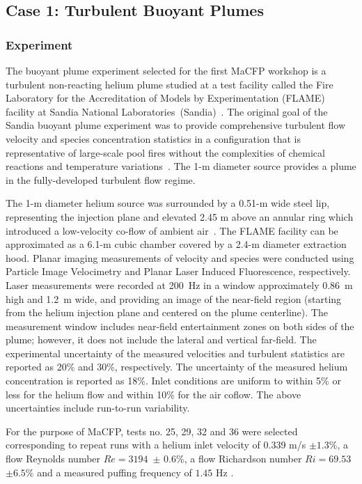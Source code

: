 
\subsection{Case 1: Turbulent Buoyant Plumes} \label{sec:buoyant_plumes}

\subsubsection{Experiment}

The buoyant plume experiment selected for the first MaCFP workshop is a turbulent non-reacting helium plume studied at a test facility called the Fire Laboratory for the Accreditation of Models by Experimentation (FLAME) facility at Sandia National Laboratories~(Sandia)~\cite{Blanchat:2001,Case1_EXP}. The original goal of the Sandia buoyant plume experiment was to provide comprehensive turbulent flow velocity and species concentration statistics in a configuration that is representative of large-scale pool fires without the complexities of chemical reactions and temperature variations~\cite{Case1_EXP}.  The 1-m diameter source provides a plume in the fully-developed turbulent flow regime.  

The 1-m diameter helium source was surrounded by a 0.51-m wide steel lip, representing the injection plane and elevated 2.45 m above an annular ring which introduced a low-velocity co-flow of ambient air~\cite{Blanchat:2001}. The FLAME facility can be approximated as a 6.1-m cubic chamber covered by a 2.4-m diameter extraction hood. Planar imaging measurements of velocity and species were conducted using Particle Image Velocimetry and Planar Laser Induced Fluorescence, respectively. Laser measurements were recorded at 200~Hz in a window approximately 0.86~m high and 1.2~m wide, and providing an image of the near-field region (starting from the helium injection plane and centered on the plume centerline). The measurement window includes near-field entertainment zones on both sides of the plume; however, it does not include the lateral and vertical far-field. The experimental uncertainty of the measured velocities and turbulent statistics are reported as 20\% and 30\%, respectively. The uncertainty of the measured helium concentration is reported as 18\%. Inlet conditions are uniform to within 5\% or less for the helium flow and within 10\% for the air coflow. The above uncertainties include run-to-run variability. 

For the purpose of MaCFP, tests no. 25, 29, 32 and 36 were selected corresponding to repeat runs with a helium inlet velocity of 0.339 m/s $\pm 1.3$\%, a flow Reynolds number $Re=3194$~$\pm$ $0.6$\%, a flow Richardson number $Ri=69.53$~$\pm 6.5\%$ and a measured puffing frequency of $1.45$ Hz \cite{Case1_EXP}.

